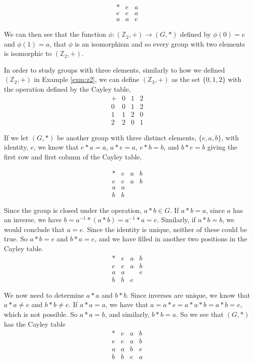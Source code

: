 \documentclass[
]{book}
\theoremstyle{definition}
\theoremstyle{definition}
\theoremstyle{definition}
\theoremstyle{remark}
\begin{document}
\[\begin{array}{c|cc}
* & e & a \\ \hline
e & e & a \\
a & a & e
\end{array}\]

We can then see that the function \(\phi:(\mathbb{Z}_2,+)\rightarrow (G,*)\) defined by \(\phi(0)=e\) and \(\phi(1)=a\), that \(\phi\) is an isomorphism and so every group with two elements is isomorphic to \((\mathbb{Z}_2,+)\).

In order to study groups with three elements, similarly to how we defined \((\mathbb{Z}_2,+)\) in Example \ref{exm:z2}, we can define
\((\mathbb{Z}_3,+)\) as the set \(\{0,1,2\}\) with the operation defined by the Cayley table,
\[\begin{array}{c|ccc}
    + & 0 & 1 & 2 \\ \hline
    0 & 0 & 1 & 2 \\
    1 & 1 & 2 & 0 \\
    2 & 2 & 0 & 1 
\end{array}\]

If we let \((G,*)\) be another group with three distinct elements, \(\{e,a,b\}\), with identity, \(e\), we know that \(e*a=a\), \(a*e=a\), \(e*b=b\), and \(b*e=b\) giving the first row and first column of the Cayley table,

\[\begin{array}{c|ccc}
    * & e & a & b \\ \hline
    e & e & a & b \\
    a & a &  &  \\
    b & b &  &  
\end{array}\]

Since the group is closed under the operation, \(a*b\in G\). If \(a*b=a\), since \(a\) has an inverse, we have \(b=a^{-1}*(a*b) = a^{-1}*a = e\). Similarly, if \(a*b=b\), we would conclude that \(a=e\). Since the identity is unique, neither of these could be true. So \(a*b=e\) and \(b*a=e\), and we have filled in another two positions in the Cayley table.
\[\begin{array}{c|ccc}
    * & e & a & b \\ \hline
    e & e & a & b \\
    a & a &  & e  \\
    b & b & e  & 
\end{array}\]

We now need to determine \(a*a\) and \(b*b\). Since inverses are unique, we know that \(a*a\neq e\) and \(b*b\neq e\). If \(a*a=a\), we have that \(a = a*e=a*a*b=a*b=e\), which is not possible. So \(a*a=b\), and similarly, \(b*b=a\). So we see that \((G,*)\) has the Cayley table
\[\begin{array}{c|ccc}
    * & e & a & b \\ \hline
    e & e & a & b \\
    a & a & b & e  \\
    b & b & e  & a
\end{array}\]
\end{document}
